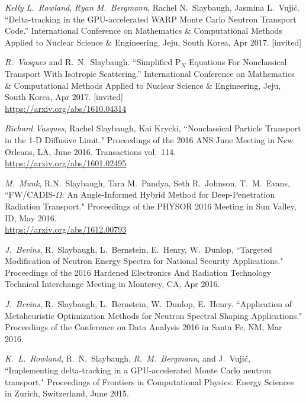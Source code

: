 \begin{bibsection}
\item \textit{Kelly L.\ Rowland}, \textit{Ryan M.\ Bergmann}, Rachel N.\ Slaybaugh, Jasmina L.\ Vuji\'c. ``Delta-tracking in the GPU-accelerated WARP Monte Carlo Neutron Transport Code.'' International Conference on Mathematics \& Computational Methods Applied to Nuclear Science \& Engineering, Jeju, South Korea, Apr 2017. [invited]

\item \textit{R.\ Vasques} and R.\ N.\ Slaybaugh. ``Simplified P$_N$ Equations For Nonclassical Transport With Isotropic Scattering.'' International Conference on Mathematics \& Computational Methods Applied to Nuclear Science \& Engineering, Jeju, South Korea, Apr 2017. [invited]\\
\url{https://arxiv.org/abs/1610.04314}

\item \textit{Richard Vasques}, Rachel Slaybaugh, Kai Krycki, ``Nonclassical Particle Transport in the 1-D Diffusive Limit." Proceedings of the 2016 ANS June Meeting in New Orleans, LA, June 2016. Transactions vol.\ 114.\\
\url{https://arxiv.org/abs/1601.02495}

\item \textit{M.\ Munk}, R.N.\ Slaybaugh, Tara M.~Pandya, Seth R.~Johnson, T.~M.~Evans, ``FW/CADIS-$\Omega$: An Angle-Informed Hybrid Method for Deep-Penetration Radiation Transport." Proceedings of the PHYSOR 2016 Meeting in Sun Valley, ID, May 2016.\\
\url{https://arxiv.org/abs/1612.00793}

\item \textit{J.\ Bevins}, R.\ Slaybaugh, L.\ Bernstein, E.\ Henry, W.\ Dunlop, ``Targeted Modification of Neutron Energy Spectra for National Security Applications." Proceedings of the 2016 Hardened Electronics And Radiation Technology Technical Interchange Meeting in Monterey, CA, Apr 2016. 

\item \textit{J.\ Bevins}, R.\ Slaybaugh, L.\ Bernstein, W.\ Dunlop, E.\ Henry. ``Application of Metaheuristic Optimization Methods for Neutron Spectral Shaping Applications." Proceedings of the Conference on Data Analysis 2016 in Santa Fe, NM, Mar 2016. 

\item \textit{K.\ L.\ Rowland}, R.\ N.\ Slaybaugh, \textit{R.\ M.\ Bergmann}, and J.\ Vuji\'c, ``Implementing delta-tracking in a GPU-accelerated Monte Carlo neutron transport," Proceedings of Frontiers in Computational Physics: Energy Sciences in Zurich, Switzerland, June 2015. 


\end{bibsection}

